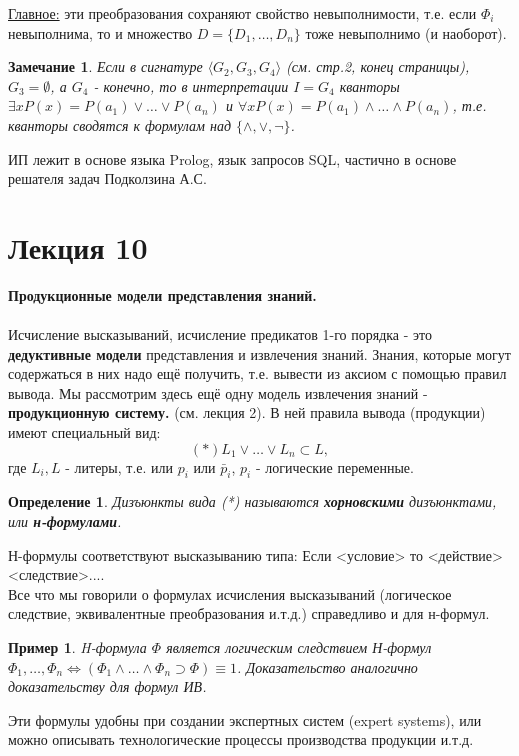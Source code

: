 \documentclass{article}
\newtheorem{example}{Пример}
\newtheorem{Remark}{Замечание}
\newtheorem{definition}{Определение}
\numberwithin{example}{section}
\numberwithin{question}{section}
\numberwithin{Remark}{section}
\numberwithin{theorem}{section}
\numberwithin{definition}{section}
\numberwithin{proposition}{section}
\begin{document}
\underline{Главное:} эти преобразования сохраняют свойство невыполнимости, т.е. если $\Phi_i$ невыполнима, то и множество $D=\{D_1,\ldots,D_n\}$ тоже невыполнимо (и наоборот).
\begin{Remark}
	Если в сигнатуре $\langle G_2,G_3,G_4\rangle$ (см. стр.2, конец страницы), $G_3=\emptyset$, а $G_4$ - конечно, то в интерпретации $I=G_4$ кванторы $\exists x P(x)=P(a_1)\vee \ldots\vee P(a_n)$ и $\forall x P(x)=P(a_1)\wedge\ldots\wedge P(a_n)$, т.е. кванторы сводятся к формулам над $\{\wedge,\vee,\lnot \}$.
\end{Remark}
ИП лежит в основе языка Prolog, язык запросов SQL, частично в основе решателя задач Подколзина А.С.

\section{Лекция 10}
\textbf{ Продукционные модели представления знаний.}\\
\\
Исчисление высказываний, исчисление предикатов 1-го порядка - это \textbf{дедуктивные модели} представления и извлечения знаний. Знания, которые могут содержаться в них надо ещё получить, т.е. вывести из аксиом с помощью правил вывода. Мы рассмотрим здесь ещё одну модель извлечения знаний - \textbf{продукционную систему.} (см. лекция 2). В ней правила вывода (продукции) имеют специальный вид:
\begin{equation*}
(*) L_1\vee \ldots \vee L_n\subset L,
\end{equation*} 
где $L_i,L$ - литеры, т.е. или $p_i$ или $\bar{p}_i$,  $p_i$ - логические переменные.
\begin{definition}
	Дизъюнкты вида (*) называются \textbf{хорновскими} дизъюнктами, или \textbf{н-формулами}.
\end{definition}
Н-формулы соответствуют высказыванию типа: Если <условие> то <действие> <следствие>....\\
Все что мы говорили о формулах исчисления высказываний (логическое следствие, эквивалентные преобразования и.т.д.) справедливо и для н-формул.
\begin{example}
	H-формула $\Phi$ является логическим следствием Н-формул $\Phi_1,\ldots,\Phi_n\Leftrightarrow(\Phi_1\wedge\ldots\wedge\Phi_n\supset \Phi)\equiv 1$. Доказательство аналогично доказательству для формул ИВ.
\end{example}
Эти формулы удобны при создании экспертных систем (expert systems), или можно описывать технологические процессы производства продукции и.т.д. \\
\end{document}
